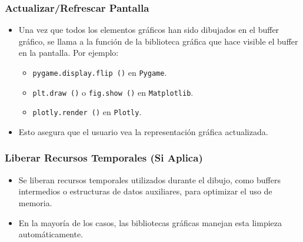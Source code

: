 \subsubsection*{Actualizar/Refrescar Pantalla}
\begin{itemize}
    \item Una vez que todos los elementos gráficos han sido dibujados en el buffer gráfico, se llama a la función de la biblioteca gráfica que hace visible el buffer en la pantalla. Por ejemplo:
    \begin{itemize}
        \item \texttt{pygame.display.flip~()} en \texttt{Pygame}.
        \item \texttt{plt.draw~()} o \texttt{fig.show~()} en \texttt{Matplotlib}.
        \item \texttt{plotly.render~()} en \texttt{Plotly}.
    \end{itemize}
    \item Esto asegura que el usuario vea la representación gráfica actualizada.
\end{itemize}

\subsubsection*{Liberar Recursos Temporales (Si Aplica)}
\begin{itemize}
    \item Se liberan recursos temporales utilizados durante el dibujo, como buffers intermedios o estructuras de datos auxiliares, para optimizar el uso de memoria.
    \item En la mayoría de los casos, las bibliotecas gráficas manejan esta limpieza automáticamente.
\end{itemize}

